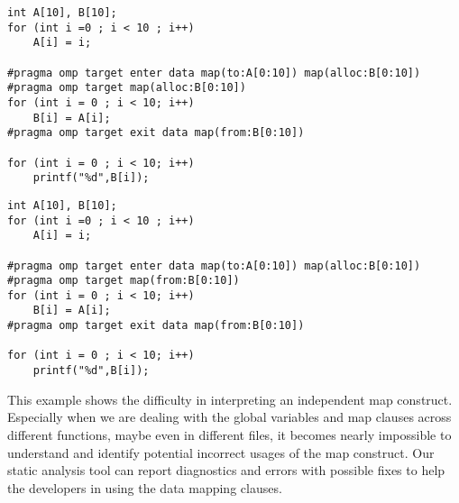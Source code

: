 \begin{minipage}{.4\textwidth}
\begin{lstlisting}[style=customc, frame=tlrb, caption={Usage of alloc}, label=incorrectegs3]
int A[10], B[10];
for (int i =0 ; i < 10 ; i++)
    A[i] = i;

#pragma omp target enter data map(to:A[0:10]) map(alloc:B[0:10])
#pragma omp target map(alloc:B[0:10])
for (int i = 0 ; i < 10; i++)
    B[i] = A[i];
#pragma omp target exit data map(from:B[0:10])

for (int i = 0 ; i < 10; i++)
    printf("%d",B[i]);
\end{lstlisting}
\end{minipage}\hfil
\begin{minipage}{.4\textwidth}
\begin{lstlisting}[style=customc, frame=tlrb, caption={Usage of from}, label=incorrectegs-fix3]
int A[10], B[10];
for (int i =0 ; i < 10 ; i++)
    A[i] = i;

#pragma omp target enter data map(to:A[0:10]) map(alloc:B[0:10])
#pragma omp target map(from:B[0:10]) 
for (int i = 0 ; i < 10; i++)
    B[i] = A[i];
#pragma omp target exit data map(from:B[0:10])

for (int i = 0 ; i < 10; i++)
    printf("%d",B[i]);
\end{lstlisting}
\end{minipage}

This example shows the difficulty in interpreting an 
independent map construct. 
Especially when we are dealing with the global variables 
and map clauses across different functions, 
maybe even in different files, 
it becomes nearly impossible to understand 
and identify potential incorrect usages of 
the map construct. 
Our static analysis tool can report diagnostics and errors with possible fixes to help the developers in using the data mapping clauses.
% 
% 
